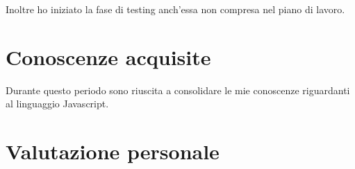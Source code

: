 Inoltre ho iniziato la fase di testing anch'essa non compresa nel piano di lavoro.

\section{Conoscenze acquisite}

Durante questo periodo sono riuscita a consolidare le mie conoscenze riguardanti al linguaggio Javascript.

\section{Valutazione personale}
